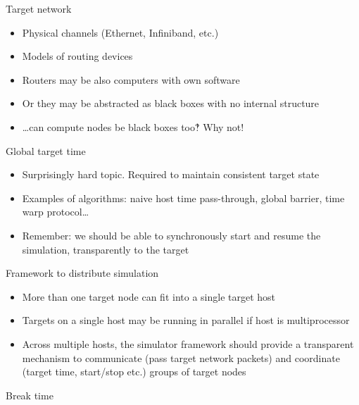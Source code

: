 \begin{frame}{Target network}

\begin{itemize}
\item Physical channels (Ethernet, Infiniband, etc.)
\item Models of routing devices
\item Routers may be also computers with own software
\item Or they may be abstracted as black boxes with no internal structure \pause
\item …can compute nodes be black boxes too‽ Why not!
\end{itemize}

\end{frame}


\begin{frame}{Global target time}

\begin{itemize}
\item Surprisingly hard topic. Required to maintain consistent target state 
\item Examples of algorithms: naive host time pass-through, global barrier, time warp protocol… 
\item Remember: we should be able to synchronously start and resume the simulation, transparently to the target
\end{itemize}

\end{frame}

\begin{frame}{Framework to distribute simulation}

\begin{itemize}
\item More than one target node can fit into a single target host
\item Targets on a single host may be running in parallel if host is multiprocessor
\item Across multiple hosts, the simulator framework should provide a transparent mechanism to communicate (pass target network packets) and coordinate (target time, start/stop etc.) groups of target nodes
\end{itemize}

\end{frame}

\begin{frame}{Break time}
\end{frame}


